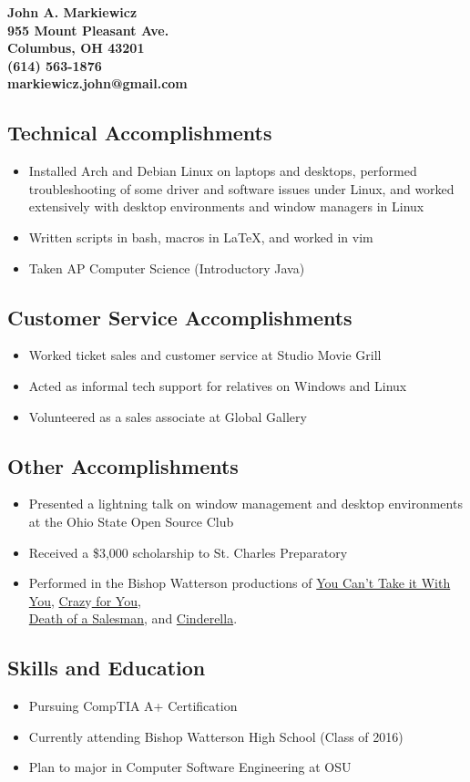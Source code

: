 \documentclass[10pt]{article}
\begin{document}
\noindent\textbf{John A. Markiewicz} \\
{\bf 955 Mount Pleasant Ave. \\
	Columbus, OH 43201 \\
	(614) 563-1876 \\
	markiewicz.john@gmail.com}
\subsection*{Technical Accomplishments}
\begin{itemize}
	\item Installed Arch and Debian Linux on laptops and desktops,
performed troubleshooting of some driver and software issues under 
		Linux, and
worked extensively with desktop environments and window managers
		in Linux
	\item Written scripts in bash, macros in \LaTeX{}, and worked in vim
	\item Taken AP Computer Science (Introductory Java)
\end{itemize}
\subsection*{Customer Service Accomplishments}
\begin{itemize}
	\item Worked ticket sales and customer service at Studio Movie Grill
	\item Acted as informal tech support for relatives on Windows and Linux
	\item Volunteered as a sales associate at Global Gallery
\end{itemize}
\subsection*{Other Accomplishments}
\begin{itemize}
	\item Presented a lightning talk on window management and desktop environments at 
		the Ohio State Open Source Club
	\item Received a  \${}3,000 scholarship to St. Charles	Preparatory
	\item Performed in the Bishop Watterson productions of \underline{You Can't 
		Take it With You}, \underline{Craz}y\underline{ for You},\\ \underline{Death of a 
		Salesman}, and \underline{Cinderella}.
\end{itemize}
\subsection*{Skills and Education}
\begin{itemize}
	\item Pursuing CompTIA A+ Certification
	\item Currently attending Bishop Watterson High School (Class of 2016)
	\item Plan to major in Computer Software Engineering at OSU
\end{itemize}
\end{document}

